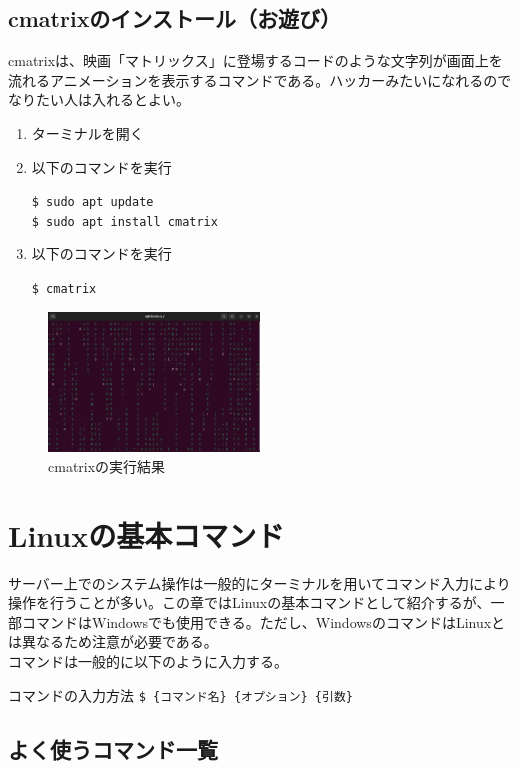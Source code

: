 \documentclass[a4paper, 11pt, dvipdfmx]{jsarticle}
\begin{document}
\subsection{cmatrixのインストール（お遊び）}
  cmatrixは、映画「マトリックス」に登場するコードのような文字列が画面上を流れるアニメーションを表示するコマンドである。ハッカーみたいになれるのでなりたい人は入れるとよい。
  \begin{enumerate}
    \item ターミナルを開く
    \item 以下のコマンドを実行
    \begin{terminalbox}
      \verb|$ sudo apt update|\\
      \verb|$ sudo apt install cmatrix|
    \end{terminalbox}
    \item 以下のコマンドを実行
    \begin{terminalbox}
      \verb|$ cmatrix|
    \end{terminalbox}
  \end{enumerate}
  \begin{figure}[H]
    \centering
    \includegraphics[width=0.5\textwidth]{images/linux-server/3_5-cmatrix.png}
    \caption{cmatrixの実行結果}
    \label{fig:cmatrix}
  \end{figure}

\section{Linuxの基本コマンド}
サーバー上でのシステム操作は一般的にターミナルを用いてコマンド入力により操作を行うことが多い。この章ではLinuxの基本コマンドとして紹介するが、一部コマンドはWindowsでも使用できる。ただし、WindowsのコマンドはLinuxとは異なるため注意が必要である。\\
  コマンドは一般的に以下のように入力する。
\begin{commandbox}{コマンドの入力方法}
  \verb|$ {コマンド名} {オプション} {引数}|
\end{commandbox}

\subsection{よく使うコマンド一覧}
\end{document}
